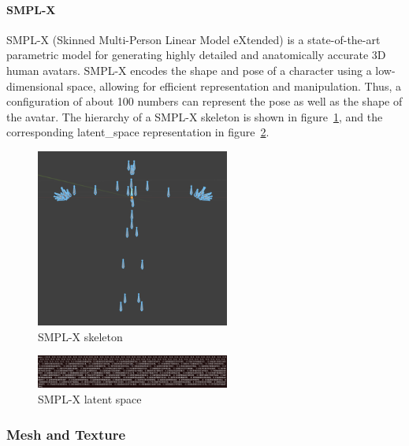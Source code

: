 \documentclass[../../main.tex]{subfiles}
\begin{document}
\paragraph{SMPL-X}
\label{ch:background_work:sign_language_synthesis:3d_techniques:skeleton:smpl_x}

SMPL-X (Skinned Multi-Person Linear Model eXtended) is a state-of-the-art parametric model for generating highly detailed and anatomically accurate 3D human avatars. SMPL-X encodes the shape and pose of a character using a low-dimensional space, allowing for efficient representation and manipulation. Thus, a configuration of about 100 numbers can represent the pose as well as the shape of the avatar. The hierarchy of a SMPL-X skeleton is shown in figure~\ref{fig:smpl_x_skeleton}, and the corresponding \gls{latent_space} representation in figure~\ref{fig:latent_space_smplx}.

\begin{figure} 
  \centering \includegraphics[width = 2.5in]{chapters/background_work/images/smpl_x_skeleton.png} 
  \caption{SMPL-X skeleton} 
  \label{fig:smpl_x_skeleton} 
\end{figure}

\begin{figure} 
  \centering \includegraphics[width = 2.5in]{chapters/background_work/images/latent_space_smplx.png} 
  \caption{SMPL-X latent space} 
  \label{fig:latent_space_smplx} 
\end{figure}

\subsubsection{Mesh and Texture}
\label{ch:background_work:sign_language_synthesis:3d_techniques:mesh_and_texture}
\end{document}
